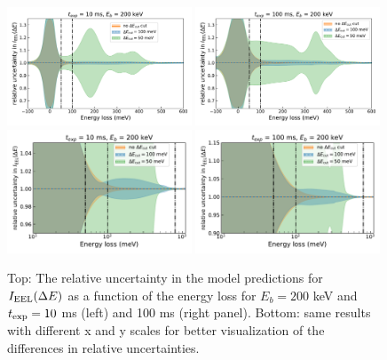 \begin{figure}[H]
    \centering
    \includegraphics[width=0.49\textwidth]{plots/prediction_with_cut_10ms_zoomout.pdf}
    \includegraphics[width=0.49\textwidth]{plots/prediction_with_cut_100ms_zoomout.pdf}
    \includegraphics[width=0.49\textwidth]{plots/prediction_with_cut_10ms.pdf}
    \includegraphics[width=0.49\textwidth]{plots/prediction_with_cut_100ms.pdf}
    \caption{Top: The relative uncertainty in the model predictions for $I_{\rm EEL}(\Delta E)$
      as a function of the energy loss for $E_b=200$ keV and $t_{\rm exp}=10$ ms (left)
      and 100 ms (right panel).
      Bottom: same results with different x and y scales for better visualization of the 
      differences in relative uncertainties. 
      }
      \label{fig:EELS_vacuum_cuts}
\end{figure}

